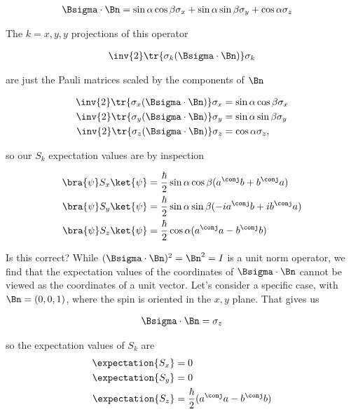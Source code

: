 \begin{align}\label{eqn:desaiCh5:305}
\Bsigma \cdot \Bn &= \sin\alpha \cos\beta \sigma_x + \sin\alpha \sin\beta \sigma_y + \cos\alpha \sigma_z 
\end{align}

The $k = x,y,y$ projections of this operator 

\begin{align}\label{eqn:desaiCh5:306}
\inv{2} \tr { \sigma_k (\Bsigma \cdot \Bn)} \sigma_k
\end{align}

are just the Pauli matrices scaled by the components of $\Bn$

\begin{align}\label{eqn:desaiCh5:307}
\inv{2} \tr { \sigma_x (\Bsigma \cdot \Bn)} \sigma_x &= \sin\alpha \cos\beta \sigma_x  \\
\inv{2} \tr { \sigma_y (\Bsigma \cdot \Bn)} \sigma_y &= \sin\alpha \sin\beta \sigma_y  \\
\inv{2} \tr { \sigma_z (\Bsigma \cdot \Bn)} \sigma_z &= \cos\alpha \sigma_z,
\end{align}

so our $S_k$ expectation values are by inspection

\begin{align}\label{eqn:desaiCh5:308}
\bra{\psi} S_x \ket{\psi} &= \frac{\hbar}{2} \sin\alpha \cos\beta ( a^\conj b + b^\conj a ) \\
\bra{\psi} S_y \ket{\psi} &= \frac{\hbar}{2} \sin\alpha \sin\beta ( - i a^\conj b + i b^\conj a ) \\
\bra{\psi} S_z \ket{\psi} &= \frac{\hbar}{2} \cos\alpha ( a^\conj a - b^\conj b )
\end{align}

Is this correct?  While $(\Bsigma \cdot \Bn)^2 = \Bn^2 = I$ is a unit norm operator, we find that the expectation values of the coordinates of $\Bsigma \cdot \Bn$ cannot be viewed as the coordinates of a unit vector.  Let's consider a specific case, with $\Bn = (0,0,1)$, where the spin is oriented in the $x,y$ plane.  That gives us

\begin{align}\label{eqn:desaiCh5:309}
\Bsigma \cdot \Bn = \sigma_z
\end{align}

so the expectation values of $S_k$ are 
\begin{align}\label{eqn:desaiCh5:310}
\expectation{S_x} &= 0 \\
\expectation{S_y} &= 0 \\
\expectation{S_z} &= \frac{\hbar}{2} ( a^\conj a - b^\conj b )
\end{align}

